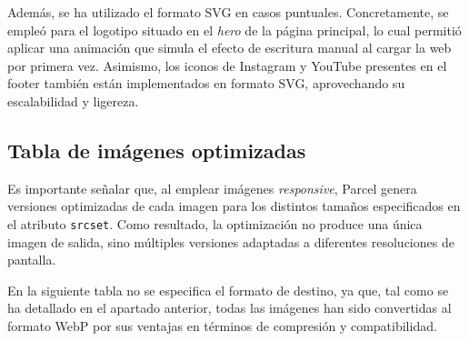 \documentclass{article}
\begin{document}
Además, se ha utilizado el formato SVG en casos puntuales. Concretamente, se empleó para el logotipo situado en el \textit{hero} de la página principal, lo cual permitió aplicar una animación que simula el efecto de escritura manual al cargar la web por primera vez. Asimismo, los iconos de Instagram y YouTube presentes en el footer también están implementados en formato SVG, aprovechando su escalabilidad y ligereza.

\subsection{Tabla de imágenes optimizadas}\label{subsec:tabla-de-imagenes-optimizadas}

Es importante señalar que, al emplear imágenes \textit{responsive}, Parcel genera versiones optimizadas de cada imagen para los distintos tamaños especificados en el atributo \lstinline{srcset}. Como resultado, la optimización no produce una única imagen de salida, sino múltiples versiones adaptadas a diferentes resoluciones de pantalla.

En la siguiente tabla no se especifica el formato de destino, ya que, tal como se ha detallado en el apartado anterior, todas las imágenes han sido convertidas al formato WebP por sus ventajas en términos de compresión y compatibilidad.
\end{document}

